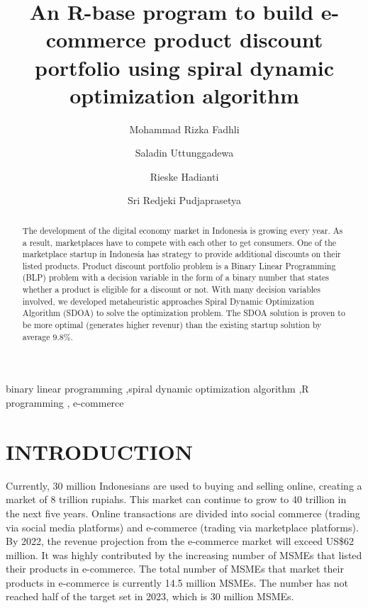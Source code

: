 \documentclass[preprint, 3p,
authoryear]{elsarticle} %
\begin{document}
\begin{frontmatter}

  \title{An R-base program to build e-commerce product discount
portfolio using spiral dynamic optimization algorithm}
    \author[lala]{Mohammad Rizka Fadhli%
  }
    \author[lili]{Saladin Uttunggadewa%
  }
  
    \author[lulu]{Rieske Hadianti%
  }
  
    \author[lili]{Sri Redjeki Pudjaprasetya%
  }
  
  
  \begin{abstract}
  The development of the digital economy market in Indonesia is growing
  every year. As a result, marketplaces have to compete with each other
  to get consumers. One of the marketplace startup in Indonesia has
  strategy to provide additional discounts on their listed products.
  Product discount portfolio problem is a Binary Linear Programming
  (BLP) problem with a decision variable in the form of a binary number
  that states whether a product is eligible for a discount or not. With
  many decision variables involved, we developed metaheuristic
  approaches Spiral Dynamic Optimization Algorithm (SDOA) to solve the
  optimization problem. The SDOA solution is proven to be more optimal
  (generates higher revenur) than the existing startup solution by
  average \(9.8 \%\).
  \end{abstract}
    \begin{keyword}
    binary linear programming \sep spiral dynamic optimization
algorithm \sep R programming \sep 
    e-commerce
  \end{keyword}
  
 \end{frontmatter}

\hypertarget{introduction}{%
\section{INTRODUCTION}\label{introduction}}

Currently, 30 million Indonesians are used to buying and selling online,
creating a market of 8 trillion rupiahs. This market can continue to
grow to 40 trillion in the next five years. Online transactions are
divided into social commerce (trading via social media platforms) and
e-commerce (trading via marketplace platforms). By 2022, the revenue
projection from the e-commerce market will exceed US\$62 million. It was
highly contributed by the increasing number of MSMEs that listed their
products in e-commerce. The total number of MSMEs that market their
products in e-commerce is currently 14.5 million MSMEs. The number has
not reached half of the target set in 2023, which is 30 million MSMEs.
\end{document}
